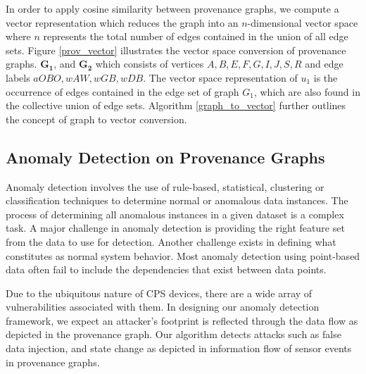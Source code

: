 

\par In order to apply cosine similarity between provenance graphs, we compute a vector representation which reduces the graph into an $n$-dimensional vector space where $n$ represents the total number of edges contained in the union of all edge sets. Figure \ref{prov_vector} illustrates the vector space conversion of provenance graphs. $\boldsymbol{G_1}$, and $\boldsymbol{G_2}$ which consists of vertices $A,B,E,F,G, I, J, S, R$ and edge labels $aOBO, wAW, wGB, wDB$. The vector space representation of $u_1$ is the occurrence of edges contained in the edge set of graph $G_1$, which  are also found in the collective union of edge sets. Algorithm \ref{graph_to_vector} further outlines the concept of graph to vector conversion.

\subsection{Anomaly Detection on Provenance Graphs}
Anomaly detection involves the use of rule-based, statistical, clustering or classification techniques to determine normal or anomalous data instances. The process of determining all anomalous instances in a given dataset is a complex task. A major challenge in anomaly detection is providing the right feature set from the data to use for detection. Another challenge exists in defining what constitutes as normal system behavior. Most anomaly detection using point-based data often fail to include the dependencies that exist between data points. 

\par Due to the ubiquitous nature of CPS devices, there are a wide array of vulnerabilities associated with them. In designing our anomaly detection framework, we expect an attacker's footprint is reflected through the data flow as depicted in the provenance graph. Our algorithm detects attacks such as false data injection, and state change as depicted in information flow of sensor events in provenance graphs.

